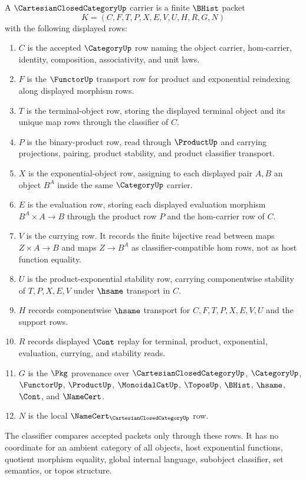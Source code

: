 \begin{definition}
\label{def:cartesian-closed-category-carrier}
A $\CartesianClosedCategoryUp$ carrier is a finite $\BHist$ packet
$$
K=(C,F,T,P,X,E,V,U,H,R,G,N)
$$
with the following displayed rows:
\begin{enumerate}
\item $C$ is the accepted $\CategoryUp$ row naming the object carrier, hom-carrier, identity, composition, associativity, and unit laws.
\item $F$ is the $\FunctorUp$ transport row for product and exponential reindexing along displayed morphism rows.
\item $T$ is the terminal-object row, storing the displayed terminal object and its unique map rows through the classifier of $C$.
\item $P$ is the binary-product row, read through $\ProductUp$ and carrying projections, pairing, product stability, and product classifier transport.
\item $X$ is the exponential-object row, assigning to each displayed pair $A,B$ an object $B^A$ inside the same $\CategoryUp$ carrier.
\item $E$ is the evaluation row, storing each displayed evaluation morphism $B^A \times A \to B$ through the product row $P$ and the hom-carrier row of $C$.
\item $V$ is the currying row. It records the finite bijective read between maps $Z \times A \to B$ and maps $Z \to B^A$ as classifier-compatible hom rows, not as host function equality.
\item $U$ is the product-exponential stability row, carrying componentwise stability of $T,P,X,E,V$ under $\hsame$ transport in $C$.
\item $H$ records componentwise $\hsame$ transport for $C,F,T,P,X,E,V,U$ and the support rows.
\item $R$ records displayed $\Cont$ replay for terminal, product, exponential, evaluation, currying, and stability reads.
\item $G$ is the $\Pkg$ provenance over $\CartesianClosedCategoryUp$, $\CategoryUp$, $\FunctorUp$, $\ProductUp$, $\MonoidalCatUp$, $\ToposUp$, $\BHist$, $\hsame$, $\Cont$, and $\NameCert$.
\item $N$ is the local $\NameCert_{\CartesianClosedCategoryUp}$ row.
\end{enumerate}
The classifier compares accepted packets only through these rows. It has no coordinate for an ambient category of all objects, host exponential functions, quotient morphism equality, global internal language, subobject classifier, set semantics, or topos structure.
\end{definition}

